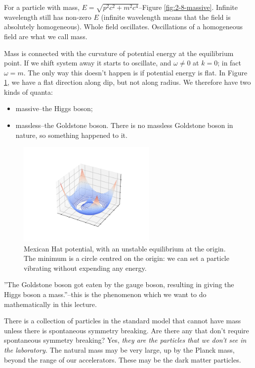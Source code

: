 \documentclass[]{article}
\begin{document}
For a particle with mass, $E=\sqrt{p^2 c^2 + m^2 c^4}$--Figure \ref{fig:2-8-massive}. Infinite wavelength still has non-zero $E$ (infinite wavelength means that the field is absolutely homogeneous). Whole field oscillates. Oscillations of a homogeneous field are what we call mass.

Mass is connected with the curvature of potential energy at the equilibrium point. If we shift system away it starts to oscillate, and $\omega \ne 0$ at $k=0$; in fact $\omega = m$. The only way this doesn't happen is if potential energy is flat. In Figure \ref{fig:mexican-hat}, we have a flat direction along dip, but not along radius. We therefore have two kinds of quanta:
\begin{itemize}
	\item massive--the Higgs boson;
	\item massless--the Goldstone boson. There is no massless Goldstone boson in nature, so something happened to it.
\end{itemize}

\begin{figure}[H]
	\begin{center}
		\caption[Mexican Hat potential]{Mexican Hat potential, with an unstable equilibrium at the origin.  The minimum is a circle centred on the origin: we can set a particle vibrating without expending any energy.}\label{fig:mexican-hat}
		\includegraphics[width=0.6\textwidth]{mexican-hat}
	\end{center}
\end{figure}

''The Goldstone boson got eaten by the gauge boson, resulting in giving the Higgs boson a mass.''--this is the phenomenon which we want to do mathematically in this lecture.

There is a collection of particles in the standard model that cannot have mass unless there is spontaneous symmetry breaking. Are there any that don't require spontaneous symmetry breaking? Yes, \emph{they are the particles that we don't see in the laboratory.} The natural mass may be very large, up by the Planck mass, beyond the range of our accelerators. These may be the dark matter particles.
\end{document}
